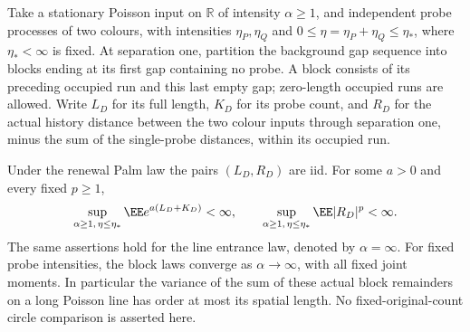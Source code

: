 \documentclass[11pt,letterpaper]{article}
\begin{document}
\begin{theorem}
\label{thm:line-block-remainder-moments}
Take a stationary Poisson input on $\mathbb R$ of intensity
$\alpha\ge1$, and independent probe processes of two colours,
with intensities $\eta_P,\eta_Q$ and
$0\le\eta=\eta_P+\eta_Q\le\eta_*$, where $\eta_*<\infty$ is fixed.
At separation one, partition the background gap sequence into
blocks ending at its first gap containing no probe. A block
consists of its preceding occupied run and this last empty gap;
zero-length occupied runs are allowed. Write $L_D$ for its full
length, $K_D$ for its probe count, and $R_D$ for the actual
history distance between the two colour inputs through
separation one, minus the sum of the single-probe distances,
within its occupied run.

Under the renewal Palm law the pairs $(L_D,R_D)$ are iid.
For some $a>0$ and every fixed $p\ge1$,
\begin{equation}\label{eq:line-block-remainder-moments}
 \sup_{\alpha\ge1,\,\eta\le\eta_*}
      \EE e^{a(L_D+K_D)}<\infty,\qquad
 \sup_{\alpha\ge1,\,\eta\le\eta_*}\EE|R_D|^p<\infty.
\end{equation}
The same assertions hold for the line entrance law, denoted by
$\alpha=\infty$. For fixed probe intensities, the block laws
converge as $\alpha\to\infty$, with all fixed joint moments.
In particular the variance of the sum of these actual block remainders on a
long Poisson line has order at most its spatial length. No
fixed-original-count circle comparison is asserted here.
\end{theorem}
\end{document}
